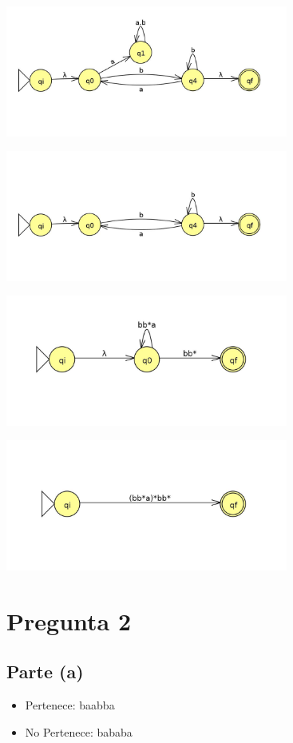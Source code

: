 \documentclass[11pt,letterpaper]{article}
\begin{document}
\includegraphics[height=4.3cm]{tarea_1-c.png}

\includegraphics[height=4.3cm]{tarea_1-c2.png}

\includegraphics[height=4.3cm]{tarea_1-c3.png}

\includegraphics[height=4.3cm]{tarea1-c4.png}

\section{Pregunta 2}
\subsection{Parte (a)}
\begin{itemize}
\item{Pertenece: baabba}
\item{No Pertenece: bababa}
\end{itemize}
\end{document}
